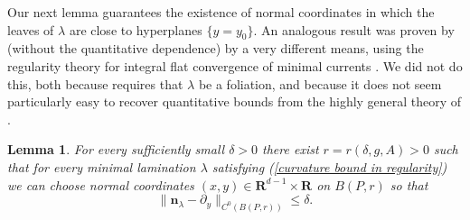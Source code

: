 \documentclass[reqno,11pt]{amsart}
\newcommand{\RR}{\mathbf{R}}
\newcommand{\normal}{\mathbf n}
\newtheorem{lemma}[theorem]{Lemma}
\theoremstyle{definition}
\numberwithin{equation}{section}
\begin{document}
Our next lemma guarantees the existence of normal coordinates in which the leaves of $\lambda$ are close to hyperplanes $\{y = y_0\}$.
An analogous result was proven by \cite{Solomon86} (without the quantitative dependence) by a very different means, using the regularity theory for integral flat convergence of minimal currents \cite[Theorem 5.3.14]{federer2014geometric}.
We did not do this, both because \cite{Solomon86} requires that $\lambda$ be a foliation, and because it does not seem particularly easy to recover quantitative bounds from the highly general theory of \cite[Chapter 5]{federer2014geometric}.

\begin{lemma}\label{lams have C0 fields}
	For every sufficiently small $\delta > 0$ there exist $r = r(\delta, g, A) > 0$ such that for every minimal lamination $\lambda$ satisfying (\ref{curvature bound in regularity}) we can choose normal coordinates $(x, y) \in \RR^{d - 1} \times \RR$ on $B(P, r)$ so that
\begin{equation}\label{normal is basically dy}
	\|\normal_\lambda - \partial_y\|_{C^0(B(P, r))} \leq \delta.
\end{equation}
\end{lemma}
\end{document}
